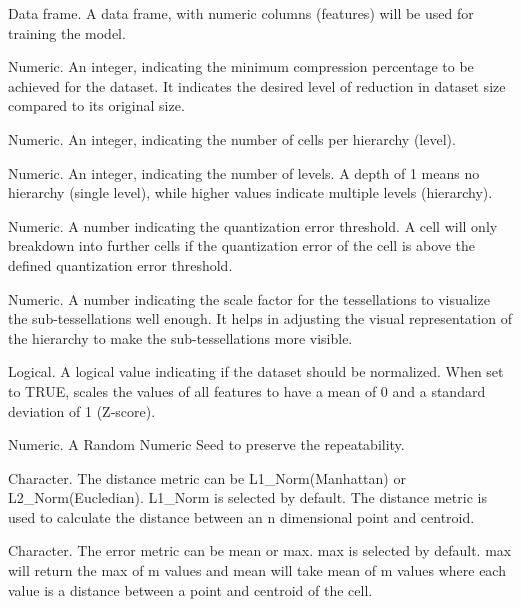 \documentclass[letterpaper]{book}
\begin{document}
\begin{Arguments}
\begin{ldescription}
\item[\code{dataset}] Data frame. A data frame, with numeric columns (features) will be used for training the model.

\item[\code{min\_compression\_perc}] Numeric. An integer, indicating the minimum compression percentage to be achieved for the dataset. 
It indicates the desired level of reduction in dataset size compared to its original size.

\item[\code{n\_cells}] Numeric. An integer, indicating the number of cells per hierarchy (level).

\item[\code{depth}] Numeric. An integer, indicating the number of levels. A depth of 1 means no hierarchy (single level), 
while higher values indicate multiple levels (hierarchy).

\item[\code{quant.err}] Numeric. A number indicating the quantization error threshold.
A cell will only breakdown into further cells if the quantization error of the cell is 
above the defined quantization error threshold.

\item[\code{projection.scale}] Numeric. A number indicating the scale factor for the tessellations to visualize the sub-tessellations
well enough. It helps in adjusting the visual representation of the hierarchy to make the sub-tessellations more visible.

\item[\code{normalize}] Logical. A logical value indicating if the dataset should be normalized. When set to TRUE, 
scales the values of all features to have a mean of 0 and a standard deviation of 1 (Z-score).

\item[\code{seed}] Numeric. A Random Numeric Seed to preserve the repeatability.

\item[\code{distance\_metric}] Character. The distance metric can be L1\_Norm(Manhattan) or L2\_Norm(Eucledian). L1\_Norm is selected by default.
The distance metric is used to calculate the distance between an n dimensional point and centroid.

\item[\code{error\_metric}] Character. The error metric can be mean or max. max is selected by default. 
max will return the max of m values and mean will take mean of m values where
each value is a distance between a point and centroid of the cell.


\end{ldescription}
\end{Arguments}
\end{document}
